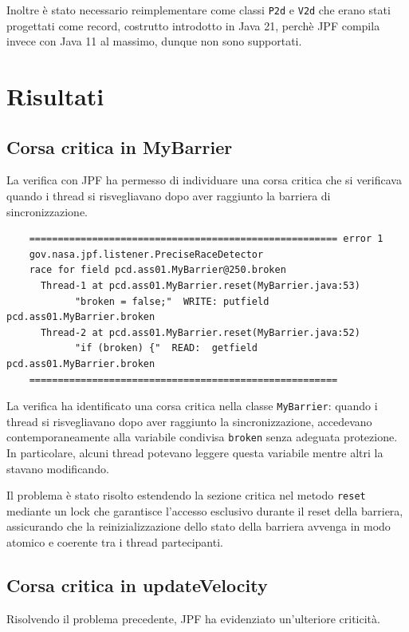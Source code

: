 \documentclass[a4paper,12pt]{report}
\begin{document}
Inoltre è stato necessario reimplementare come classi \texttt{P2d} e \texttt{V2d} che erano stati progettati come record, costrutto introdotto in Java 21, perchè JPF compila invece con Java 11 al massimo, dunque non sono supportati.

\section{Risultati}

\subsection{Corsa critica in MyBarrier}
La verifica con JPF ha permesso di individuare una corsa critica che si verificava quando i thread si risvegliavano dopo aver raggiunto la barriera di sincronizzazione.

\begin{verbatim}
    ====================================================== error 1
    gov.nasa.jpf.listener.PreciseRaceDetector
    race for field pcd.ass01.MyBarrier@250.broken
      Thread-1 at pcd.ass01.MyBarrier.reset(MyBarrier.java:53)
            "broken = false;"  WRITE: putfield pcd.ass01.MyBarrier.broken
      Thread-2 at pcd.ass01.MyBarrier.reset(MyBarrier.java:52)
            "if (broken) {"  READ:  getfield pcd.ass01.MyBarrier.broken
    ====================================================== 
\end{verbatim}

La verifica ha identificato una corsa critica nella classe \texttt{MyBarrier}: quando i thread si risvegliavano dopo aver raggiunto la sincronizzazione, accedevano contemporaneamente alla variabile condivisa \texttt{broken} senza adeguata protezione. In particolare, alcuni thread potevano leggere questa variabile mentre altri la stavano modificando.

Il problema è stato risolto estendendo la sezione critica nel metodo \texttt{reset} mediante un lock che garantisce l'accesso esclusivo durante il reset della barriera, assicurando che la reinizializzazione dello stato della barriera avvenga in modo atomico e coerente tra i thread partecipanti.

\subsection{Corsa critica in updateVelocity}
Risolvendo il problema precedente, JPF ha evidenziato un'ulteriore criticità.
\end{document}
